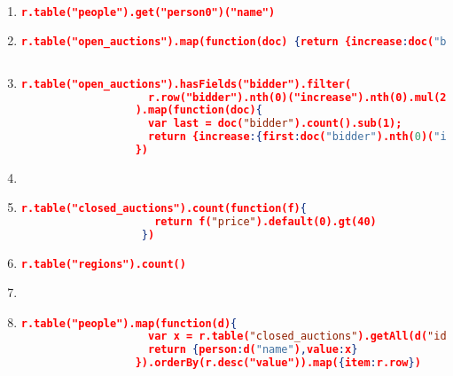 \begin{enumerate}[label=Q\arabic*.]
	\item \label{rethink-q-1}%
	
	\begin{lstlisting}[language=JSON, basicstyle=\scriptsize]
		r.table("people").get("person0")("name")
	\end{lstlisting}

	\item \label{rethink-q-2}%
	\begin{lstlisting}[language=JSON, basicstyle=\scriptsize]
	r.table("open_auctions").map(function(doc) {return {increase:doc("bidder").nth(0)("increase").nth(0).default("")}})
	
	\end{lstlisting}
	
    \item \label{rethink-q-3}%
	\begin{lstlisting}[language=JSON, basicstyle=\scriptsize]
	  r.table("open_auctions").hasFields("bidder").filter(
	                r.row("bidder").nth(0)("increase").nth(0).mul(2).le(r.row("bidder").nth(r.row("bidder").count().sub(1))("increase").nth(0))
	              ).map(function(doc){
	                var last = doc("bidder").count().sub(1);
	                return {increase:{first:doc("bidder").nth(0)("increase").nth(0), last:doc("bidder").nth(last)("increase").nth(0)} }
	              })
	\end{lstlisting}
	
	
    \item \label{rethink-q-4}%
	\par
	
	
    \item \label{rethink-q-5}%
	\begin{lstlisting}[language=JSON, basicstyle=\scriptsize]
	   r.table("closed_auctions").count(function(f){
	                 return f("price").default(0).gt(40)
	               })
	\end{lstlisting}
	
    \item \label{rethink-q-6}%
	\begin{lstlisting}[language=JSON, basicstyle=\scriptsize]
	   r.table("regions").count()
	\end{lstlisting}
	
	
    \item \label{rethink-q-7}%
    \par
	
	
    \item \label{rethink-q-8}%
	\begin{lstlisting}[language=JSON, basicstyle=\scriptsize]
	  r.table("people").map(function(d){
	                var x = r.table("closed_auctions").getAll(d("id"),{index:"buyer_person"}).count();
	                return {person:d("name"),value:x}
	              }).orderBy(r.desc("value")).map({item:r.row})
	\end{lstlisting}
	

\end{enumerate}
